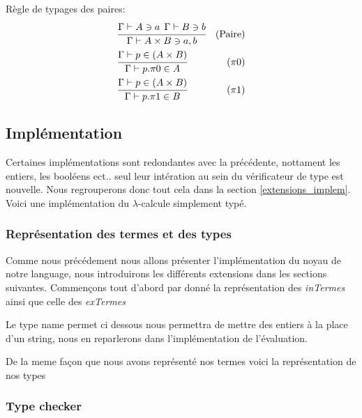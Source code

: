 \documentclass {article}
\newcommand{\codefrom}[3]
           {}
\theoremstyle{definition}
\theoremstyle{remark}
\begin{document}
Règle de typages des paires:
\begin{align*}
  &\cfrac{\Gamma\vdash A\ni a \:\: \Gamma\vdash B\ni b}
  {\Gamma\vdash A\times B \ni a,b}&\mbox{(Paire)} \\
  &\cfrac{\Gamma\vdash p \in (A\times B)} 
  {\Gamma\vdash p.\pi 0 \in A}&\mbox{($\pi 0$)} \\
  &\cfrac{\Gamma\vdash p \in (A\times B)} 
  {\Gamma\vdash p.\pi 1 \in B}&\mbox{($\pi 1$)} \\
\end{align*}


\subsection{Implémentation}

Certaines implémentations sont redondantes avec la précédente, nottament les 
entiers, les booléens ect.. seul leur intération au sein du vérificateur de type
est nouvelle. Nous regrouperons donc tout cela dans la section \ref{extensions_implem}.
Voici une implémentation du $\lambda$-calcule simplement typé.

\subsubsection{Représentation des termes et des types}

Comme nous précédement nous allons  
présenter l'implémentation du noyau de notre language, nous introduirons 
les différents extensions dans les sections suivantes.
Commençons tout d'abord par donné la représentation des \emph{inTermes}
ainsi que celle des \emph{exTermes}

\codefrom{typed}{lambda}{inTm}
\codefrom{typed}{lambda}{exTm}

Le type name permet ci dessous nous permettra de mettre des entiers à la place 
d'un string, nous en reparlerons dans l'implémentation de l'évaluation.
\codefrom{typed}{lambda}{name}

De la meme façon que nous avons représenté nos termes voici la 
représentation de nos types 

\codefrom{typed}{lambda}{Type}


\subsubsection{Type checker}
\end{document}
